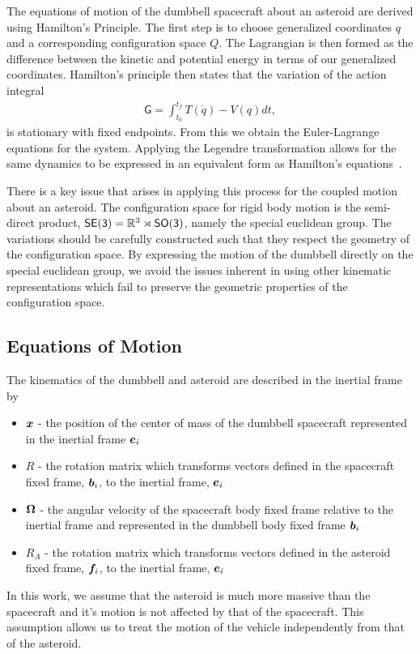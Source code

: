 \documentclass[letterpaper, paper,11pt]{AAS}		%
\begin{document}
The equations of motion of the dumbbell spacecraft about an asteroid are derived using Hamilton's Principle. 
The first step is to choose generalized coordinates \( q \) and a corresponding configuration space \( Q \).
The Lagrangian is then formed as the difference between the kinetic and potential energy in terms of our generalized coordinates. 
Hamilton's principle then states that the variation of the action integral
\begin{align}
    \mathsf{G} = \int_{t_0}^{t_f} T(\dot{q}) - V(q) dt,
\end{align}
is stationary with fixed endpoints. 
From this we obtain the Euler-Lagrange equations for the system.
Applying the Legendre transformation allows for the same dynamics to be expressed in an equivalent form as Hamilton's equations~\cite{lanczos1970}.

There is a key issue that arises in applying this process for the coupled motion about an asteroid.
The configuration space for rigid body motion is the semi-direct product, \(\mathsf{SE(3)} = \mathbb{R}^3 \rtimes \mathsf{SO(3)} \), namely the special euclidean group.
The variations should be carefully constructed such that they respect the geometry of the configuration space.
By expressing the motion of the dumbbell directly on the special euclidean group, we avoid the issues inherent in using other kinematic representations which fail to preserve the geometric properties of the configuration space.

\subsection{Equations of Motion}

The kinematics of the dumbbell and asteroid are described in the inertial frame by
\begin{itemize}
    \item \( \bm{x} \) - the position of the center of mass of the dumbbell spacecraft represented in the inertial frame \( \bm{e}_i\)
    \item \( R \) - the rotation matrix which transforms vectors defined in the spacecraft fixed frame, \( \bm{b}_i \), to the inertial frame, \( \bm{e}_i \)
    \item \( \bm{\Omega} \) - the angular velocity of the spacecraft body fixed frame relative to the inertial frame and represented in the dumbbell body fixed frame \( \bm{b}_i \)
    \item \( R_A \) - the rotation matrix which transforms vectors defined in the asteroid fixed frame, \( \bm{f}_i \), to the inertial frame, \( \bm{e}_i \)
\end{itemize}
In this work, we assume that the asteroid is much more massive than the spacecraft and it's motion is not affected by that of the spacecraft.
This assumption allows us to treat the motion of the vehicle independently from that of the asteroid. 
\end{document}
